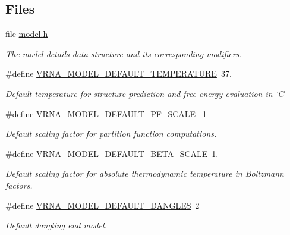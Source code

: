 \subsection*{Files}
\begin{DoxyCompactItemize}
\item 
file \hyperlink{model_8h}{model.\+h}
\begin{DoxyCompactList}\small\item\em The model details data structure and its corresponding modifiers. \end{DoxyCompactList}\end{DoxyCompactItemize}
\begin{DoxyCompactItemize}
\item 
\#define \hyperlink{group__model__details_gaf47f9850b3b4763479f7a7e7a15648a2}{V\+R\+N\+A\+\_\+\+M\+O\+D\+E\+L\+\_\+\+D\+E\+F\+A\+U\+L\+T\+\_\+\+T\+E\+M\+P\+E\+R\+A\+T\+U\+RE}~37.
\begin{DoxyCompactList}\small\item\em   Default temperature for structure prediction and free energy evaluation in $^\circ C$  \end{DoxyCompactList}\item 
\#define \hyperlink{group__model__details_ga5505389cba74a18bbc116d2bb20256fa}{V\+R\+N\+A\+\_\+\+M\+O\+D\+E\+L\+\_\+\+D\+E\+F\+A\+U\+L\+T\+\_\+\+P\+F\+\_\+\+S\+C\+A\+LE}~-\/1
\begin{DoxyCompactList}\small\item\em Default scaling factor for partition function computations. \end{DoxyCompactList}\item 
\#define \hyperlink{group__model__details_ga383d3ac8d08c3b6221754b50871c1200}{V\+R\+N\+A\+\_\+\+M\+O\+D\+E\+L\+\_\+\+D\+E\+F\+A\+U\+L\+T\+\_\+\+B\+E\+T\+A\+\_\+\+S\+C\+A\+LE}~1.
\begin{DoxyCompactList}\small\item\em Default scaling factor for absolute thermodynamic temperature in Boltzmann factors. \end{DoxyCompactList}\item 
\#define \hyperlink{group__model__details_ga2aa7bc2cae774b83a5c468f824c27a42}{V\+R\+N\+A\+\_\+\+M\+O\+D\+E\+L\+\_\+\+D\+E\+F\+A\+U\+L\+T\+\_\+\+D\+A\+N\+G\+L\+ES}~2
\begin{DoxyCompactList}\small\item\em Default dangling end model. \end{DoxyCompactList}\item 

\end{DoxyCompactItemize}
